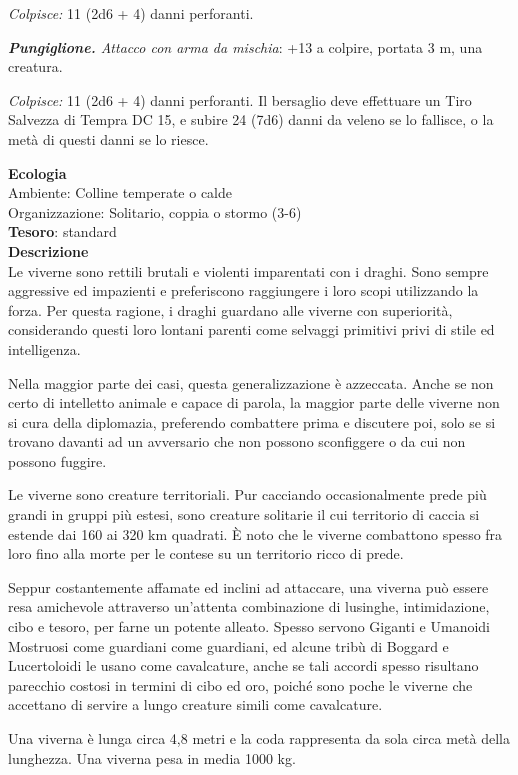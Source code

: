 \begin{multicols}{2}
	\textit{Colpisce:} 11 (2d6 + 4) danni perforanti.

	\textit{\textbf{Pungiglione.} Attacco con arma da mischia}: +13 a colpire, portata 3 m, una creatura.

	\textit{Colpisce:} 11 (2d6 + 4) danni perforanti. Il bersaglio deve effettuare un Tiro Salvezza di Tempra DC 15, e subire 24 (7d6) danni da veleno se lo fallisce, o la metà di questi danni se lo riesce.

	\textbf{Ecologia}\\
	Ambiente: Colline temperate o calde\\
	Organizzazione: Solitario, coppia o stormo (3-6)\\
	\textbf{Tesoro}: standard\\
	\textbf{Descrizione}\\
	Le viverne sono rettili brutali e violenti imparentati con i draghi. Sono sempre aggressive ed impazienti e preferiscono raggiungere i loro scopi utilizzando la forza. Per questa ragione, i draghi guardano alle viverne con superiorità, considerando questi loro lontani parenti come selvaggi primitivi privi di stile ed intelligenza.

	Nella maggior parte dei casi, questa generalizzazione è azzeccata. Anche se non certo di intelletto animale e capace di parola, la maggior parte delle viverne non si cura della diplomazia, preferendo combattere prima e discutere poi, solo se si trovano davanti ad un avversario che non possono sconfiggere o da cui non possono fuggire.

	Le viverne sono creature territoriali. Pur cacciando occasionalmente prede più grandi in gruppi più estesi, sono creature solitarie il cui territorio di caccia si estende dai 160 ai 320 km quadrati. È noto che le viverne combattono spesso fra loro fino alla morte per le contese su un territorio ricco di prede.

	Seppur costantemente affamate ed inclini ad attaccare, una viverna può essere resa amichevole attraverso un'attenta combinazione di lusinghe, intimidazione, cibo e tesoro, per farne un potente alleato. Spesso servono Giganti e Umanoidi Mostruosi come guardiani come guardiani, ed alcune tribù di Boggard e Lucertoloidi le usano come cavalcature, anche se tali accordi spesso risultano parecchio costosi in termini di cibo ed oro, poiché sono poche le viverne che accettano di servire a lungo creature simili come cavalcature.

	Una viverna è lunga circa 4,8 metri e la coda rappresenta da sola circa metà della lunghezza. Una viverna pesa in media 1000 kg.



\end{multicols}
